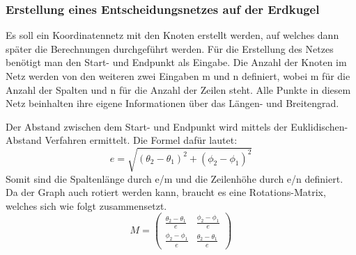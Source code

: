 \subsubsection{Erstellung eines Entscheidungsnetzes auf der Erdkugel}
Es soll ein Koordinatennetz mit den Knoten erstellt werden, auf welches dann später die Berechnungen durchgeführt werden. Für die Erstellung des Netzes benötigt man den Start- und Endpunkt als Eingabe. Die Anzahl der Knoten im Netz werden von den weiteren zwei Eingaben m und n definiert, wobei m für die Anzahl der Spalten und n für die Anzahl der Zeilen steht. Alle Punkte in diesem Netz beinhalten ihre eigene Informationen über das Längen- und Breitengrad.

Der Abstand zwischen dem Start- und Endpunkt wird mittels der Euklidischen-Abstand Verfahren ermittelt. Die Formel dafür lautet:
\begin{equation}
\label{eq:2}
e = \sqrt{ (\theta_2 - \theta_1)^2 + (\phi_2-\phi_1)^2}
 \end{equation}
Somit sind die Spaltenlänge durch e/m und die Zeilenhöhe durch e/n definiert. Da der Graph auch rotiert werden kann, braucht es eine Rotations-Matrix, welches sich wie folgt zusammensetzt.
\begin{equation}
\label{eq:3}
M = \begin{pmatrix} \frac{\theta_2 - \theta_1}{e} & \frac{\phi_2 - \phi_1}{e} \\ \frac{\phi_2 - \phi_1}{e} & \frac{\theta_2 - \theta_1}{e} \end{pmatrix}
 \end{equation}
 

